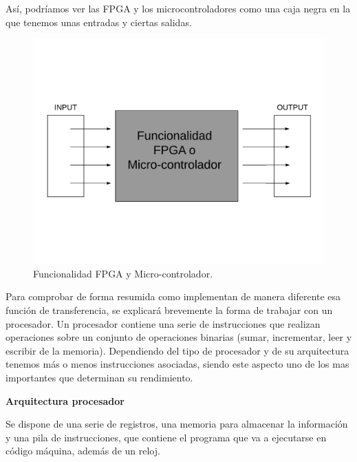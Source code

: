 Así, podríamos ver las FPGA y los microcontroladores como una caja negra en la que tenemos unas entradas y ciertas salidas.\newline


\begin{figure}[H]
	\center
	\includegraphics[trim = 0mm 30mm 0mm 30mm, clip,scale=0.4]{imagenes/EstadoArte/funcionalidad_FPGA_micro.pdf}
	\caption{Funcionalidad FPGA y Micro-controlador.}
	\label{fig:funcionalidad_FPGA_micro}
\end{figure}

Para comprobar de forma resumida como implementan de manera diferente esa función de transferencia, se explicará brevemente la forma de trabajar con un procesador. \newline
Un procesador contiene una serie de instrucciones que realizan operaciones sobre un conjunto de operaciones binarias (sumar, incrementar, leer y escribir de la memoria). Dependiendo del tipo de procesador y de su arquitectura tenemos más o menos instrucciones asociadas, siendo este aspecto uno de los mas importantes que determinan su rendimiento.

\textbf{Arquitectura procesador}

Se dispone de una serie de registros, una memoria para almacenar la información y una pila de instrucciones, que contiene el programa que va a ejecutarse en código máquina, además de un reloj.\newline


